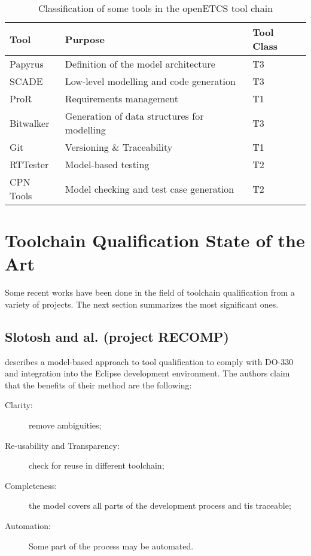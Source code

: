 \begin{table}
\begin{center}
\begin{tabular}{lll}
Tool&Purpose&Tool Class\\\hline
Papyrus&Definition of the model architecture&T3\\
SCADE&Low-level modelling and code generation&T3\\
ProR&Requirements management&T1\\
Bitwalker&Generation of data structures for modelling&T3\\
Git&Versioning \& Traceability&T1\\
RTTester&Model-based testing&T2\\
CPN Tools&Model checking and test case generation&T2\\
\end{tabular}
\end{center}
\caption{Classification of some tools in the openETCS tool chain}
\label{tab:oetcs_tool_classification}
\end{table}
 
\section{Toolchain Qualification State of the Art}
\label{sec-1-2}
Some recent works have been done in the field of toolchain
qualification from a variety of projects. The next section summarizes
the most significant ones.

\subsection{Slotosh and al. (project RECOMP)}
\label{sec-1-2.1}

 \cite{slotosch_model-based_2012} describes a model-based approach to tool
 qualification to comply with DO-330 and integration into the Eclipse
 development environment. The authors claim that the benefits of their
 method  are the following:

\begin{description}
\item[Clarity:] remove ambiguities;
\item[Re-usability and Transparency:] check for reuse in different toolchain;
\item[Completeness:] the model covers all parts of the  development
  process and tis traceable;
\item[Automation:] Some part of the process may be automated.
\end{description}

